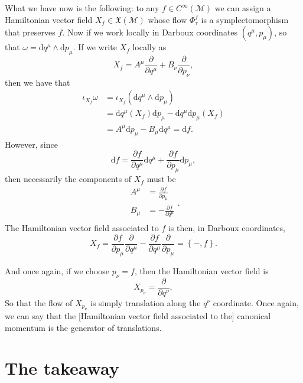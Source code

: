 \documentclass[11pt,a4]{article}
\newcommand{\de}{\mathrm{d}}
\newcommand{\pdev}[2]{\frac{\partial #1}{\partial #2}}
\newcommand{\set}[1]{\left\{#1\right\}}
\begin{document}
What we have now is the following: to any $f\in C^\infty(\mathcal{M})$ we can assign a Hamiltonian vector field $X_f\in \mathfrak{X}(\mathcal{M})$ whose flow $\Phi^f_\tau$ is a symplectomorphism that preserves $f$. Now if we work locally in Darboux coordinates $(q^\mu,p_\mu)$, so that $\omega = \de q^\mu\wedge \de p_\mu$. If
we write $X_f$ locally as
\begin{equation}
  \label{eq:20}
  X_f = A^\mu\pdev{}{q^\mu} + B_{\nu}\pdev{}{p_\nu},
\end{equation}
then we have that
\begin{equation}
  \label{eq:21}
  \begin{aligned}
    \iota_{X_f}\omega &= \iota_{X_f}\left(\de q^\mu\wedge \de p_\mu\right)\\
    &= \de q^\mu(X_f)\de p_\mu - \de q^\mu\de p_\mu(X_f)\\
    &= A^\mu\de p_\mu - B_\mu\de q^\mu = \de f.
  \end{aligned}
\end{equation}
However, since
\begin{equation*}
  \de f = \pdev{f}{q^\mu}\de q^\mu + \pdev{f}{p_\mu}\de p_\mu,
\end{equation*}
then necessarily the components of $X_f$ must be
\begin{equation}
  \label{eq:22}
  \begin{aligned}
    A^\mu &= \pdev{f}{p_\mu}\\
    B_\mu &= -\pdev{f}{q^\mu}\\
  \end{aligned}.
\end{equation}
The Hamiltonian vector field associated to $f$ is then, in Darboux coordinates,
\begin{equation}
  \label{eq:23}
  X_f = \pdev{f}{p_\mu}\pdev{}{q^\mu} -\pdev{f}{q^\mu}\pdev{}{p_\mu} = \set{-,f}.
\end{equation}

And once again, if we choose $p_\nu =f$, then the Hamiltonian vector field is
\begin{equation}
  \label{eq:24}
  X_{p_\nu} = \pdev{}{q^\nu},
\end{equation}
So that the flow of $X_{p_\nu}$ is simply translation along the $q^\nu$ coordinate. Once again, we can
say that the [Hamiltonian vector field associated to the] canonical momentum is the generator of translations.

\section*{The takeaway}
\label{sec:takeaway}
\end{document}
